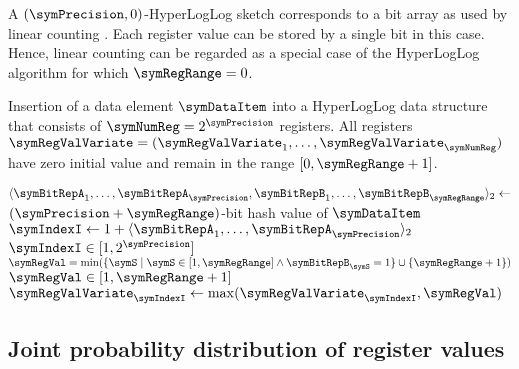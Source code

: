 \documentclass[a4paper]{scrartcl}
\begin{document}
A $(\symPrecision, 0)$-HyperLogLog sketch corresponds to a bit array as used by linear counting \cite{Whang1990}. Each register value can be stored by a single bit in this case. Hence, linear counting can be regarded as a special case of the HyperLogLog algorithm for which $\symRegRange = 0$.

\begin{algorithm}
\caption{Insertion of a data element $\symDataItem$ into a HyperLogLog data structure that consists of $\symNumReg=2^\symPrecision$ registers. All registers $\boldsymbol{\symRegValVariate} = (\symRegValVariate_1,\ldots,\symRegValVariate_\symNumReg)$ have zero initial value and remain in the range $[0, \symRegRange+1]$.}
\label{alg:insert}
\begin{algorithmic}
\State $\langle \symBitRepA_1, \ldots, \symBitRepA_\symPrecision,\symBitRepB_1,\ldots,\symBitRepB_\symRegRange\rangle_2 \gets$ $(\symPrecision + \symRegRange)$-bit hash value of $\symDataItem$
\State $\symIndexI \gets 1+ \langle \symBitRepA_1, \ldots, \symBitRepA_\symPrecision\rangle_2$
\Comment $\symIndexI\in[1,2^\symPrecision]$
\State $\symRegVal = \min(\{\symS\mid \symS \in [1, \symRegRange]  \wedge  \symBitRepB_\symS = 1\}\cup {\{\symRegRange+1\}} )$
\Comment $\symRegVal\in[1,\symRegRange+1]$
\State $\symRegValVariate_\symIndexI \gets\max(\symRegValVariate_\symIndexI, \symRegVal)$
\EndProcedure
\end{algorithmic}
\end{algorithm}

\subsection{Joint probability distribution of register values}
\end{document}
